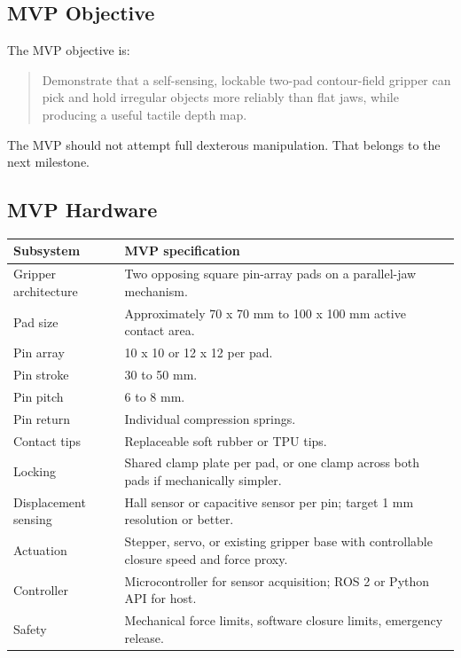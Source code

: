 \documentclass[11pt]{article}
\begin{document}
\subsection{MVP Objective}

The MVP objective is:

\begin{quote}
Demonstrate that a self-sensing, lockable two-pad contour-field gripper can pick and hold irregular objects more reliably than flat jaws, while producing a useful tactile depth map.
\end{quote}

The MVP should not attempt full dexterous manipulation. That belongs to the next milestone.

\subsection{MVP Hardware}

\begin{longtable}{L{0.25\textwidth} L{0.62\textwidth}}
\toprule
\textbf{Subsystem} & \textbf{MVP specification} \\
\midrule
\endhead
Gripper architecture & Two opposing square pin-array pads on a parallel-jaw mechanism. \\
Pad size & Approximately 70 x 70 mm to 100 x 100 mm active contact area. \\
Pin array & 10 x 10 or 12 x 12 per pad. \\
Pin stroke & 30 to 50 mm. \\
Pin pitch & 6 to 8 mm. \\
Pin return & Individual compression springs. \\
Contact tips & Replaceable soft rubber or TPU tips. \\
Locking & Shared clamp plate per pad, or one clamp across both pads if mechanically simpler. \\
Displacement sensing & Hall sensor or capacitive sensor per pin; target 1 mm resolution or better. \\
Actuation & Stepper, servo, or existing gripper base with controllable closure speed and force proxy. \\
Controller & Microcontroller for sensor acquisition; ROS 2 or Python API for host. \\
Safety & Mechanical force limits, software closure limits, emergency release. \\
\bottomrule
\end{longtable}
\end{document}
